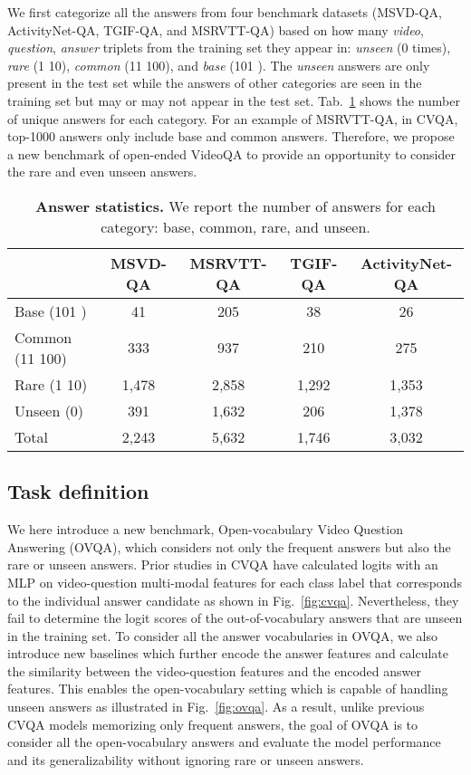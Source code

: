 \documentclass[10pt,twocolumn,letterpaper]{article}
\begin{document}
We first categorize all the answers from four benchmark datasets (MSVD-QA, ActivityNet-QA, TGIF-QA, and MSRVTT-QA) based on how many \textit{video}, \textit{question}, \textit{answer} triplets from the training set they appear in: \textit{unseen} (0 times), \textit{rare} (1  10), \textit{common} (11  100), and \textit{base} (101 ).
The \textit{unseen} answers are only present in the test set while the answers of other categories are seen in the training set but may or may not appear in the test set.
Tab.~\ref{tab:statistics} shows the number of unique answers for each category.
For an example of MSRVTT-QA, in CVQA, top-1000 answers only include base and common answers.
Therefore, we propose a new benchmark of open-ended VideoQA to provide an opportunity to consider the rare and even unseen answers. \begin{table}[t!]
    \centering
    \begin{adjustbox}{width=\linewidth}
    \begin{tabular}{l|c c c c}
        \toprule
        & MSVD-QA & MSRVTT-QA & TGIF-QA & ActivityNet-QA \\
        \midrule
        \midrule 
        Base (101 )   & 41 & 205 & 38 & 26 \\
        Common (11  100) & 333 & 937 & 210 & 275 \\
        Rare (1  10)   & 1,478 & 2,858 & 1,292 & 1,353 \\
        Unseen (0) & 391 & 1,632 & 206 & 1,378 \\
        \midrule
        Total   & 2,243 & 5,632 & 1,746 & 3,032 \\
        \bottomrule
    \end{tabular}
    \end{adjustbox}
    \caption{\textbf{Answer statistics.}
    We report the number of answers for each category: base, common, rare, and unseen.
    }
    \label{tab:statistics}
\end{table} \subsection{Task definition}

We here introduce a new benchmark, Open-vocabulary Video Question Answering (OVQA), which considers not only the frequent answers but also the rare or unseen answers.
Prior studies in CVQA have calculated logits with an MLP on video-question multi-modal features for each class label that corresponds to the individual answer candidate as shown in Fig.~\ref{fig:cvqa}.
Nevertheless, they fail to determine the logit scores of the out-of-vocabulary answers that are unseen in the training set.
To consider all the answer vocabularies in OVQA, we also introduce new baselines which further encode the answer features and calculate the similarity between the video-question features and the encoded answer features. 
This enables the open-vocabulary setting which is capable of handling unseen answers as illustrated in Fig.~\ref{fig:ovqa}.
As a result, unlike previous CVQA models memorizing only frequent answers, the goal of OVQA is to consider all the open-vocabulary answers and evaluate the model performance and its generalizability without ignoring rare or unseen answers.
\end{document}
